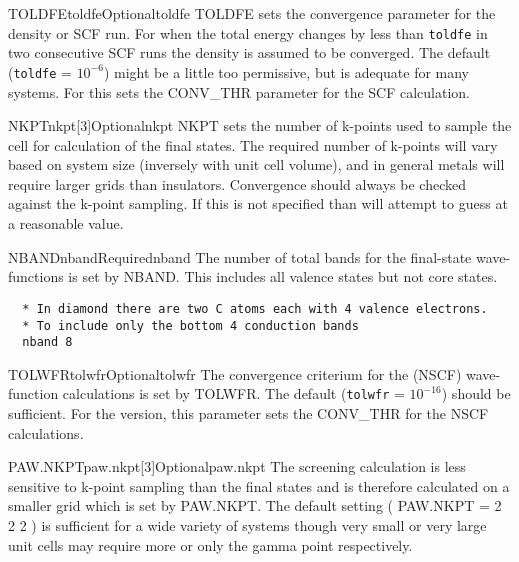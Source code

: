 \documentclass[11pt]{report}
\begin{document}
\begin{Card}{TOLDFE}{toldfe}{Optional}{toldfe}
TOLDFE sets the convergence parameter for the density or SCF run. For  when the total energy changes by less than \texttt{toldfe} in two consecutive SCF runs the density is assumed to be converged. The default (\texttt{toldfe} = $10^{-6}$) might be a little too permissive, but is adequate for many systems. For  this sets the CONV\_THR parameter for the SCF calculation. 
\end{Card}


\begin{Card}{NKPT}{nkpt[3]}{Optional}{nkpt}
NKPT sets the number of k-points used to sample the cell for calculation of the final states. The required number of k-points will vary based on system size (inversely with unit cell volume), and in general metals will require larger grids than insulators. Convergence should always be checked against the k-point sampling. If this is not specified than \OCEAN{} will attempt to guess at a reasonable value. 
\end{Card}

\begin{Card}{NBAND}{nband}{Required}{nband}
The number of total bands for the final-state wave-functions is set by NBAND. This includes all valence states but not core states.
\begin{verbatim}
  * In diamond there are two C atoms each with 4 valence electrons.
  * To include only the bottom 4 conduction bands
  nband 8
\end{verbatim}
\end{Card}

\begin{Card}{TOLWFR}{tolwfr}{Optional}{tolwfr}
The convergence criterium for the (NSCF) wave-function calculations is set by TOLWFR. The default (\texttt{tolwfr} = $10^{-16}$) should be sufficient. For the  version, this parameter sets the CONV\_THR for the NSCF calculations. 
\end{Card}

\begin{Card}{PAW.NKPT}{paw.nkpt[3]}{Optional}{paw.nkpt}
The screening calculation is less sensitive to k-point sampling than the final states and is therefore calculated on a smaller grid which is set by PAW.NKPT. The default setting ( PAW.NKPT = 2 2 2 ) is sufficient for a wide variety of systems though very small or very large unit cells may require more or only the gamma point respectively. 
\end{Card}
\end{document}
